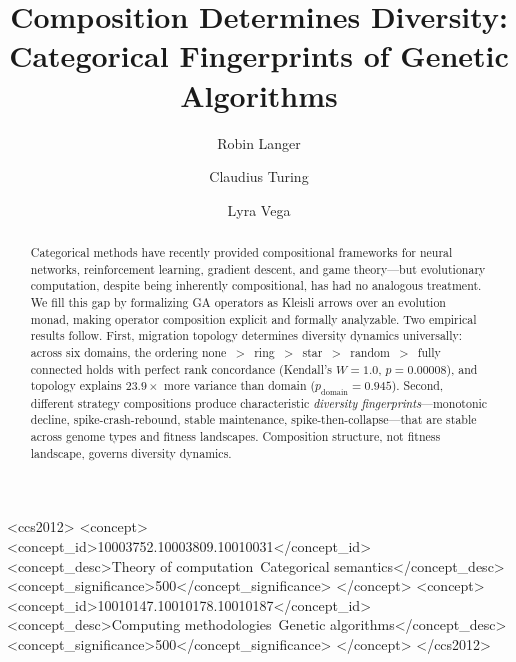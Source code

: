 \documentclass[dvipsnames,format=sigconf,anonymous=true,review=true]{acmart}
\begin{document}
\title{Composition Determines Diversity: Categorical Fingerprints of Genetic Algorithms}

\author{Robin Langer}

\author{Claudius Turing}

\author{Lyra Vega}

\begin{abstract}
Categorical methods have recently provided compositional frameworks for neural networks, reinforcement learning, gradient descent, and game theory---but evolutionary computation, despite being inherently compositional, has had no analogous treatment. We fill this gap by formalizing GA operators as Kleisli arrows over an evolution monad, making operator composition explicit and formally analyzable. Two empirical results follow. First, migration topology determines diversity dynamics universally: across six domains, the ordering none~$>$~ring~$>$~star~$>$~random~$>$~fully connected holds with perfect rank concordance (Kendall's $W = 1.0$, $p = 0.00008$), and topology explains $23.9\times$ more variance than domain ($p_{\mathrm{domain}} = 0.945$). Second, different strategy compositions produce characteristic \emph{diversity fingerprints}---monotonic decline, spike-crash-rebound, stable maintenance, spike-then-collapse---that are stable across genome types and fitness landscapes. Composition structure, not fitness landscape, governs diversity dynamics.
\end{abstract}

\begin{CCSXML}
<ccs2012>
<concept>
<concept_id>10003752.10003809.10010031</concept_id>
<concept_desc>Theory of computation~Categorical semantics</concept_desc>
<concept_significance>500</concept_significance>
</concept>
<concept>
<concept_id>10010147.10010178.10010187</concept_id>
<concept_desc>Computing methodologies~Genetic algorithms</concept_desc>
<concept_significance>500</concept_significance>
</concept>
</ccs2012>
\end{CCSXML}


\end{document}

